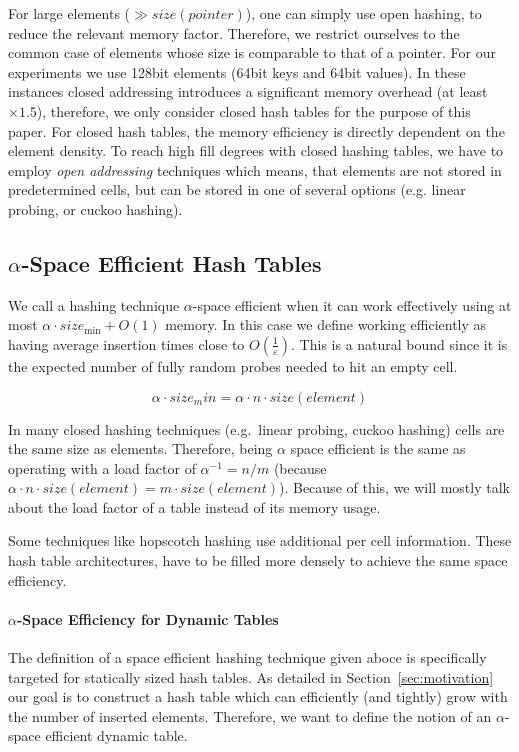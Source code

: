 \documentclass[a4paper,UKenglish]{lipics-v2016}
\begin{document}
For large elements ($\gg size(pointer)$), one can simply use open
hashing, to reduce the relevant memory factor.  Therefore, we restrict
ourselves to the common case of elements whose size is comparable to
that of a pointer.  For our experiments we use 128bit elements (64bit
keys and 64bit values).  In these instances closed addressing
introduces a significant memory overhead (at least $\times1.5$),
therefore, we only consider closed hash tables for the purpose of this
paper. For closed hash tables, the memory efficiency is directly
dependent on the element density.  To reach high fill degrees with
closed hashing tables, we have to employ \emph{open addressing}
techniques which means, that elements are not stored in predetermined
cells, but can be stored in one of several options (e.g. linear
probing, or cuckoo hashing).

\subsection{$\alpha$-Space Efficient Hash Tables}
\label{sec:pre_staticspace}
We call a hashing technique $\alpha$-space efficient when it can work
effectively using at most $\alpha \cdot size_{\min} + O(1)$ memory. In
this case we define working efficiently as having average insertion
times close to $O(\frac{1}{\varepsilon})$. This is a natural bound
since it is the expected number of fully random probes needed to hit
an empty cell.

\[\alpha \cdot size_min = \alpha\cdot n\cdot size(element)\]

In many closed hashing techniques (e.g.~linear probing, cuckoo
hashing) cells are the same size as elements. Therefore, being
$\alpha$ space efficient is the same as operating with a load factor
of $\alpha^{-1} = n/m$ (because $\alpha\cdot n \cdot size(element) = m\cdot
size(element)$).  Because of this, we will mostly talk about the load
factor of a table instead of its memory usage.

Some techniques like hopscotch hashing use additional per cell
information.  These hash table architectures, have to be filled more
densely to achieve the same space efficiency.

\paragraph*{$\alpha$-Space Efficiency for Dynamic Tables}
The definition of a space efficient hashing technique given aboce is
specifically targeted for statically sized hash tables.  As detailed
in Section~\ref{sec:motivation} our goal is to construct a hash table
which can efficiently (and tightly) grow with the number of inserted
elements. Therefore, we want to define the notion of an $\alpha$-space
efficient dynamic table.
\end{document}
